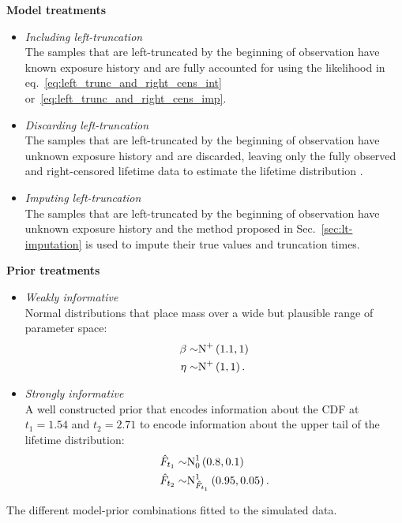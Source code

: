 \begin{table}
    \centering
    \begin{multicols}{2}
    
    \textbf{Model treatments}
    \begin{itemize}
        \item[] \emph{Including left-truncation}\\ The samples that are left-truncated by the beginning of observation have known exposure history and are fully accounted for using the likelihood in eq.~\eqref{eq:left_trunc_and_right_cens_int} or~\eqref{eq:left_trunc_and_right_cens_imp}.
        \item[] \emph{Discarding left-truncation}\\ The samples that are left-truncated by the beginning of observation have unknown exposure history and are discarded, leaving only the fully observed and right-censored lifetime data to estimate the lifetime distribution \citep{guo1993}.
        \item[] \emph{Imputing left-truncation}\\ The samples that are left-truncated by the beginning of observation have unknown exposure history and the method proposed in Sec.~\ref{sec:lt-imputation} is used to impute their true values and truncation times.
    \end{itemize}

    \columnbreak
    
    \textbf{Prior treatments}
    \begin{itemize}
        \item[] \emph{Weakly informative}\\ Normal distributions that place mass over a wide but plausible range of parameter space:
        \begin{align*}
            \beta \sim & \hbox{N}^{+}\left(1.1, 1\right)  \\
            \eta \sim & \hbox{N}^{+}\left(1, 1\right).
        \end{align*}
        \item[] \emph{Strongly informative}\\ A well constructed prior that encodes information about the CDF at $t_1 = 1.54$ and $t_2 = 2.71$ to encode information about the upper tail of the lifetime distribution:
        \begin{align*}
            \hat{F}_{t_1} \sim & \hbox{N}^{1}_{0}\left(0.8, 0.1\right)    \\
            \hat{F}_{t_2} \sim & \hbox{N}^{1}_{\hat{F}_{t_1}}\left(0.95, 0.05\right).
        \end{align*}
    \end{itemize}

    \end{multicols}
    \caption{The different model-prior combinations fitted to the simulated data.}\label{tab:model-prior-comb}
\end{table}

